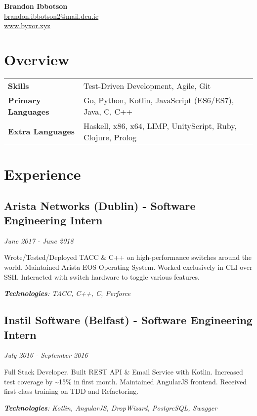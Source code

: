 \documentclass{article}
\newcommand{\youremail}[1]{\href{mailto:#1}{#1}}
\newcommand{\yourtitle}[3]{
  \begin{center}
    {\huge\bfseries #1}\\
    \vspace{0.5em}
    \youremail{#2}\\
    \url{#3}\\
  \end{center}
}
\begin{document}
\yourtitle{Brandon Ibbotson}{brandon.ibbotson2@mail.dcu.ie}{www.byxor.xyz}
\section{Overview}
\begin{tabularx}{\textwidth}{ll}
\vspace{0.75em}
\textbf{Skills} & Test-Driven Development, Agile, Git\\
\vspace{0.75em}
\textbf{Primary Languages} & Go, Python, Kotlin, JavaScript (ES6/ES7), Java, C, C++\\
\textbf{Extra Languages} & Haskell, x86, x64, LIMP, UnityScript, Ruby, Clojure, Prolog\\
\end{tabularx}
\section{Experience}
\subsection{Arista Networks (Dublin) - Software Engineering Intern}
\textit{June 2017 - June 2018}

Wrote/Tested/Deployed TACC \& C++ on high-performance switches around the world. Maintained Arista EOS Operating System. Worked exclusively in CLI over SSH. Interacted with switch hardware to toggle various features.

\textit{\textbf{Technologies}: TACC, C++, C, Perforce}
\vspace{0.5em}
\subsection{Instil Software (Belfast) - Software Engineering Intern}
\textit{July 2016 - September 2016}

Full Stack Developer. Built REST API \& Email Service with Kotlin. Increased test coverage by \textasciitilde{}15\% in first month. Maintained AngularJS frontend. Received first-class training on TDD and Refactoring.

\textit{\textbf{Technologies}: Kotlin, AngularJS, DropWizard, PostgreSQL, Swagger}
\vspace{0.5em}
\end{document}
